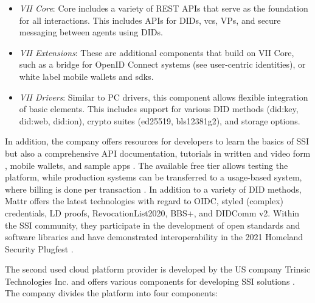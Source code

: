    \begin{itemize}
        \item \textit{VII Core}: Core includes a variety of REST APIs that serve as the foundation for all interactions. This includes APIs for \acp{DID}, \acp{vc}, \acp{VP}, and secure messaging between agents using \acp{DID}. \cite{Mattr_vii_2021}
        \item \textit{VII Extensions}: These are additional components that build on VII Core, such as a bridge for OpenID Connect systems (see user-centric identities), or white label mobile wallets and \acp{sdk}. \cite{Mattr_vii_2021-1}
        \item \textit{VII Drivers}: Similar to PC drivers, this component allows flexible integration of basic elements. This includes support for various \ac{DID} methods (did:key, did:web, did:ion), crypto suites (ed25519, bls12381g2)\cite{Mattr_vii_2021-2}, and storage options. \cite{Mattr_vii_2021-3}
    \end{itemize}
    
    In addition, the company offers resources for developers to learn the basics of \ac{SSI} \cite{Mattr_resources_2021} but also a comprehensive API documentation, tutorials in written and video form \cite{Mattr_Mattr_2021}, mobile wallets, and sample apps \cite{Mattr_Mattr_2021-1, Mattr_vii_2021}. The available free tier allows testing the platform, while production systems can be transferred to a usage-based system, where billing is done per transaction \cite{Mattr_Mattr_2021-3}. In addition to a variety of \ac{DID} methods, Mattr offers the latest technologies with regard to \ac{OIDC}, styled (complex) credentials, LD proofs, RevocationList2020, BBS+, and DIDComm v2. Within the \ac{SSI} community, they participate in the development of open standards \cite{Mattr_approach_2021, looker_bbs_2021} and software libraries \cite{Mattr_Mattr_2021-5} and have demonstrated interoperability in the 2021 Homeland Security Plugfest  \cite{homeland_security_interoperability_2021}.
    
    The second used cloud platform provider is developed by the US company Trinsic Technologies Inc. and offers various components for developing \ac{SSI} solutions \cite{trinsic_trinsic_2021}. The company divides the platform into four components:
    
